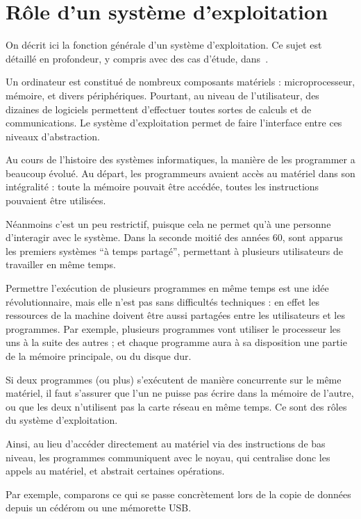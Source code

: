 \section{Rôle d'un système d'exploitation}

On décrit ici la fonction générale d'un système d'exploitation. Ce sujet est
détaillé en profondeur, y compris avec des cas d'étude, dans~\cite{tanenbaum}.

Un ordinateur est constitué de nombreux composants matériels : microprocesseur,
mémoire, et divers périphériques. Pourtant, au niveau de l'utilisateur, des
dizaines de logiciels permettent d'effectuer toutes sortes de calculs et de
communications. Le système d'exploitation permet de faire l'interface entre ces
niveaux d'abstraction.

Au cours de l'histoire des systèmes informatiques, la manière de les programmer
a beaucoup évolué. Au départ, les programmeurs avaient accès au matériel dans
son intégralité : toute la mémoire pouvait être accédée, toutes les instructions
pouvaient être utilisées.

Néanmoins c'est un peu restrictif, puisque cela ne permet qu'à une personne
d'interagir avec le système. Dans la seconde moitié des années 60, sont apparus
les premiers systèmes ``à temps partagé'', permettant à plusieurs utilisateurs
de travailler en même temps.

Permettre l'exécution de plusieurs programmes en même temps est une idée
révolutionnaire, mais elle n'est pas sans difficultés techniques : en effet les
ressources de la machine doivent être aussi partagées entre les utilisateurs et
les programmes. Par exemple, plusieurs programmes vont utiliser le processeur
les uns à la suite des autres ; et chaque programme aura à sa disposition une
partie de la mémoire principale, ou du disque dur.

Si deux programmes (ou plus) s'exécutent de manière concurrente sur le même
matériel, il faut s'assurer que l'un ne puisse pas écrire dans la mémoire de
l'autre, ou que les deux n'utilisent pas la carte réseau en même temps. Ce sont
des rôles du système d'exploitation.

Ainsi, au lieu d'accéder directement au matériel via des instructions de bas
niveau, les programmes communiquent avec le noyau, qui centralise donc les
appels au matériel, et abstrait certaines opérations.

Par exemple, comparons ce qui se passe concrètement lors de la copie de données
depuis un cédérom ou une mémorette USB.

